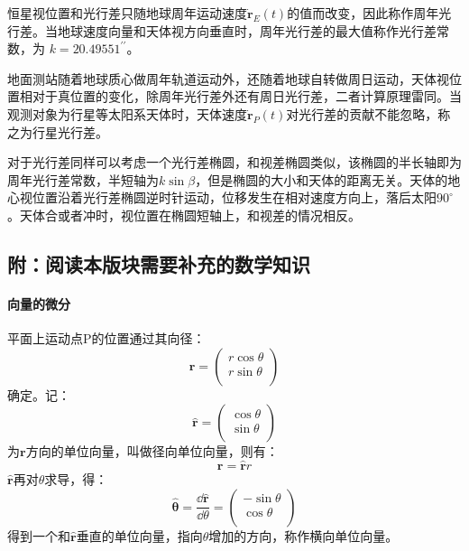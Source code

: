 恒星视位置和光行差只随地球周年运动速度$\boldsymbol{\dot{r}}_{E}(t)$的值而改变，因此称作周年光行差。当地球速度向量和天体视方向垂直时，周年光行差的最大值称作光行差常数，为
$k=20.49551^{\prime\prime}$。

地面测站随着地球质心做周年轨道运动外，还随着地球自转做周日运动，天体视位置相对于真位置的变化，除周年光行差外还有周日光行差，二者计算原理雷同。当观测对象为行星等太阳系天体时，天体速度$\boldsymbol{\dot{r}}_{P}(t)$对光行差的贡献不能忽略，称之为行星光行差。

对于光行差同样可以考虑一个光行差椭圆，和视差椭圆类似，该椭圆的半长轴即为周年光行差常数，半短轴为$k\sin\beta$，但是椭圆的大小和天体的距离无关。天体的地心视位置沿着光行差椭圆逆时针运动，位移发生在相对速度方向上，落后太阳$90^\circ$。天体合或者冲时，视位置在椭圆短轴上，和视差的情况相反。

\subsection{附：阅读本版块需要补充的数学知识}
\paragraph{向量的微分}
平面上运动点P的位置通过其向径：
\begin{equation}
	\boldsymbol{r}=\begin{pmatrix}
		r\cos \theta\\
		r \sin \theta\\
	\end{pmatrix}
\end{equation}
确定。记：
\begin{equation}
	\hat{\boldsymbol{r}}=\begin{pmatrix}
		\cos \theta\\
		\sin \theta\\
	\end{pmatrix}
\end{equation}
为$\boldsymbol{r}$方向的单位向量，叫做径向单位向量，则有：
\begin{equation}
	\boldsymbol{r}=\hat{\boldsymbol{r}}r
\end{equation}
$\hat{\boldsymbol{r}}$再对$\theta$求导，得：
\begin{equation}
	\hat{\boldsymbol{\theta}}=\frac{\dd \hat{\boldsymbol{r}}}{\dd \theta}=\begin{pmatrix}
		-\sin \theta\\
		\cos \theta\\
	\end{pmatrix}
\end{equation}
得到一个和$\hat{\boldsymbol{r}}$垂直的单位向量，指向$\theta$增加的方向，称作横向单位向量。

